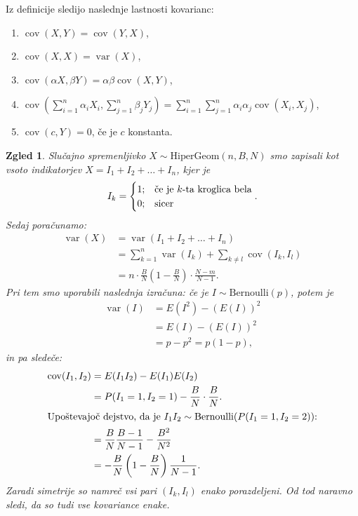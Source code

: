 \documentclass[10pt, a4paper]{article}
\newtheorem{zgled}[izr]{Zgled}
\DeclareMathOperator{\cov}{cov}
\DeclareMathOperator{\vari}{var}
\begin{document}
Iz definicije sledijo naslednje lastnosti kovarianc:
\begin{enumerate}
  \item $\cov(X, Y) = \cov(Y, X)$,
  \item $\cov(X, X) = \vari(X)$,
  \item $\cov(\alpha X, \beta Y) = \alpha \beta \cov(X, Y)$,
  \item $\cov\left(\sum_{i = 1} ^n \alpha_i X_i, \sum_{j = 1} ^n \beta_j Y_j\right) = \sum_{i = 1} ^n \sum_{j = 1} ^n \alpha_i \alpha_j \cov(X_i, X_j)$,
  \item $\cov(c, Y) = 0$, če je $c$ konstanta.
\end{enumerate}

\begin{zgled}
  Slučajno spremenljivko $X \sim \mathrm{HiperGeom} (n, B, N)$ smo zapisali kot vsoto indikatorjev 
  $X = I_1 + I_2 + \dots + I_n$, kjer je 
  $$I_k = \begin{cases}
    1;& \textup{če je $k$-ta kroglica bela}\\
    0;& \textup{sicer}
  \end{cases}.$$
  Sedaj poračunamo:
  \begin{align*}
    \vari(X) &= \vari(I_1 + I_2 + \dots + I_n)\\
    &= \sum_{k = 1} ^n \vari(I_k) + \sum_{k \neq l} \cov(I_k, I_l)\\
    &= n \cdot \frac{B}{N} \left(1 - \frac{B}{N}\right) \cdot \frac{N - m}{N - 1}.
  \end{align*}
  Pri tem smo uporabili naslednja izračuna: če je $I \sim \mathrm{Bernoulli}(p)$, potem je
  \begin{align*}
    \vari(I) &= E(I^2) - (E(I))^2\\
    &= E(I) - (E(I))^2\\
    &= p - p^2 = p(1 - p),
  \end{align*}
  in pa sledeče:
  \begin{align*}
    \cov(I_1, I_2) &= E(I_1 I_2) - E(I_1) E(I_2)\\
    &= P(I_1 = 1, I_2 = 1) - \frac{B}{N} \cdot \frac{B}{N}.\\
    \intertext{Upoštevajoč dejstvo, da je $I_1 I_2 \sim \mathrm{Bernoulli}(P(I_1 = 1, I_2 = 2))$:}
    &= \frac{B}{N} \frac{B - 1}{N - 1} - \frac{B^2}{N^2}\\
    &= -\frac{B}{N} \left(1 - \frac{B}{N}\right) \frac{1}{N - 1}.
  \end{align*}
  Zaradi simetrije so namreč vsi pari $(I_k, I_l)$ enako porazdeljeni.
  Od tod naravno sledi, da so tudi vse kovariance enake.
\end{zgled}
\end{document}
